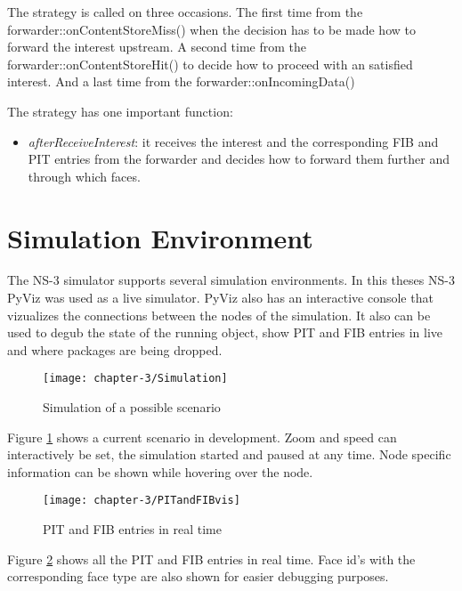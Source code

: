 The strategy is called on three occasions. The first time from the forwarder::onContentStoreMiss() when the decision has to be made how to forward the interest upstream. A second time from the forwarder::onContentStoreHit() to decide how to proceed with an satisfied interest. And a last time from the forwarder::onIncomingData()

\vspace{5mm} %

The strategy has one important function:

\begin{itemize}
\item \emph{afterReceiveInterest}: it receives the interest and the corresponding FIB and PIT entries from the forwarder and decides how to forward them further and through which faces.
\end{itemize}

\section{Simulation Environment}

The NS-3 simulator supports several simulation environments. In this theses NS-3 PyViz was used as a live simulator. PyViz also has an interactive console that vizualizes the connections between the nodes of the simulation. It also can be used to degub the state of the running object, show PIT and FIB entries in live and where packages are being dropped.

\begin{figure}[H]
  \centering
  \texttt{[image: chapter-3/Simulation]}
  \caption{Simulation of a possible scenario}
  \label{fig:Simulation}
\end{figure}

Figure \ref{fig:Simulation} shows a current scenario in development. Zoom and speed can interactively be set, the simulation started and paused at any time. Node specific information can be shown while hovering over the node.

\begin{figure}[H]
  \centering
  \texttt{[image: chapter-3/PITandFIBvis]}
  \caption{PIT and FIB entries in real time}
  \label{fig:PITandFIBvis}
\end{figure}

Figure \ref{fig:PITandFIBvis} shows all the PIT and FIB entries in real time. Face id's with the corresponding face type are also shown for easier debugging purposes.
